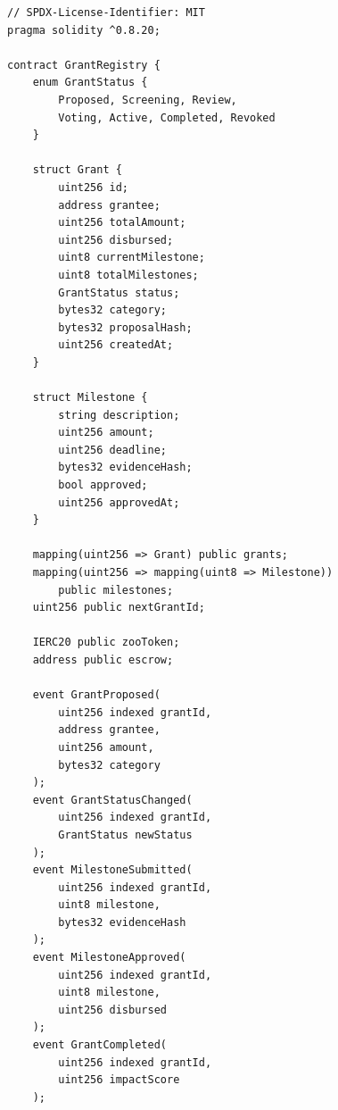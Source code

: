 \documentclass[11pt,letterpaper]{article}
\begin{document}
\begin{lstlisting}[language=Solidity,caption=GrantRegistry contract]
// SPDX-License-Identifier: MIT
pragma solidity ^0.8.20;

contract GrantRegistry {
    enum GrantStatus {
        Proposed, Screening, Review,
        Voting, Active, Completed, Revoked
    }

    struct Grant {
        uint256 id;
        address grantee;
        uint256 totalAmount;
        uint256 disbursed;
        uint8 currentMilestone;
        uint8 totalMilestones;
        GrantStatus status;
        bytes32 category;
        bytes32 proposalHash;
        uint256 createdAt;
    }

    struct Milestone {
        string description;
        uint256 amount;
        uint256 deadline;
        bytes32 evidenceHash;
        bool approved;
        uint256 approvedAt;
    }

    mapping(uint256 => Grant) public grants;
    mapping(uint256 => mapping(uint8 => Milestone))
        public milestones;
    uint256 public nextGrantId;

    IERC20 public zooToken;
    address public escrow;

    event GrantProposed(
        uint256 indexed grantId,
        address grantee,
        uint256 amount,
        bytes32 category
    );
    event GrantStatusChanged(
        uint256 indexed grantId,
        GrantStatus newStatus
    );
    event MilestoneSubmitted(
        uint256 indexed grantId,
        uint8 milestone,
        bytes32 evidenceHash
    );
    event MilestoneApproved(
        uint256 indexed grantId,
        uint8 milestone,
        uint256 disbursed
    );
    event GrantCompleted(
        uint256 indexed grantId,
        uint256 impactScore
    );


\end{lstlisting}
\end{document}

